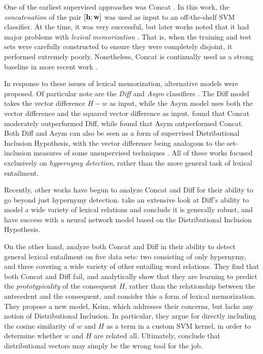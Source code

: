 One of the earliest supervised approaches was Concat \cite{baroni:2012:eacl}.
In this work, the {\em concatenation} of the pair $[{\mathbf{h}}; {\mathbf{w}}]$ was used as input
to an off-the-shelf SVM classifier. At the time, it was very successful, but later
works noted that it had major problems with {\em lexical memorization}
\cite{roller:2014:coling,weeds:2014:coling,levy:2015:naacl}. That is, when
the training and test sets were carefully constructed to ensure they were
completely disjoint, it performed extremely poorly. Nonetheless, Concat is
continually used as a strong baseline in more recent work
\cite{kruszewski:2015:tacl}.

In response to these issues of lexical memorization, alternative models
were proposed. Of particular note are the {\em Diff}
\cite{fu:2014:acl,weeds:2014:coling} and {\em Asym} classifiers
\cite{roller:2014:coling}. The Diff model takes the vector difference
$H-w$ as input, while the Asym model uses both the vector difference and
the squared vector difference as input.
 found that Concat moderately outperformed Diff,
while  found that Asym outperformed
Concat. Both Diff and Asym can also be seen as a form of supervised
Distributional Inclusion Hypothesis, with the vector difference being analogous
to the set-inclusion measures of some unsupervised techniques \cite{roller:2014:coling}.
All of these works focused exclusively on {\em hypernymy detection},
rather than the more general task of lexical entailment.

Recently, other works have begun to analyze Concat and Diff for their ability
to go beyond just hypernymy detection.  take an
extensive look at Diff's ability to model a wide variety of lexical relations
and conclude it is generally robust, and  have
success with a neural network model based on the Distributional Inclusion
Hypothesis.

On the other hand,
 analyze both Concat and Diff in their ability to
detect general lexical entailment on five data sets: two consisting of
only hypernymy, and three covering a wide variety of other entailing
word relations. They find that both Concat and
Diff fail, and analytically show that they are learning to predict the {\em
prototypicality} of the consequent $H$, rather than the relationship between the
antecedent and the consequent, and consider this a form of lexical memorization.
They propose a new model, Ksim, which addresses
their concerns, but lacks any notion of Distributional Inclusion.
In particular, they argue for directly including the
cosine similarity of $w$ and $H$ as a term in a custom SVM kernel, in
order to determine whether $w$ and $H$ are related all. Ultimately,
 conclude that distributional vectors may simply be
the wrong tool for the job.

